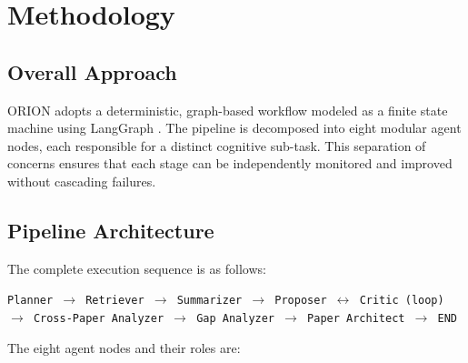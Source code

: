 \documentclass[12pt, a4paper]{article}
\begin{document}
\section{Methodology}

\subsection{Overall Approach}
ORION adopts a deterministic, graph-based workflow modeled as a finite state machine using
LangGraph \cite{langgraph2024}. The pipeline is decomposed into eight modular agent nodes,
each responsible for a distinct cognitive sub-task. This separation of concerns ensures that
each stage can be independently monitored and improved without cascading failures.

\subsection{Pipeline Architecture}

The complete execution sequence is as follows:

\vspace{0.4cm}
\begin{center}
\small
\texttt{Planner $\rightarrow$ Retriever $\rightarrow$ Summarizer $\rightarrow$ Proposer
$\leftrightarrow$ Critic (loop) $\rightarrow$ Cross-Paper Analyzer $\rightarrow$
Gap Analyzer $\rightarrow$ Paper Architect $\rightarrow$ END}
\end{center}
\vspace{0.4cm}

\noindent The eight agent nodes and their roles are:
\end{document}
